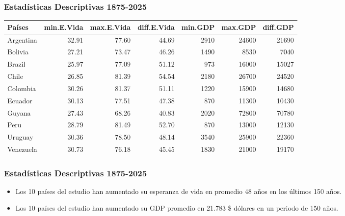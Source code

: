 \documentclass{beamer}
\begin{document}
\begin{frame}[fragile]
\frametitle{Estadísticas Descriptivas 1875-2025}
{\scriptsize
\begin{table}[ht]
\centering
\begin{tabular}{lrrrrrr}
  \hline
Países & min.E.Vida & max.E.Vida & diff.E.Vida & min.GDP & max.GDP & diff.GDP \\ 
  \hline
Argentina & 32.91 & 77.60 & 44.69 & 2910 & 24600 & 21690 \\ 
  Bolivia & 27.21 & 73.47 & 46.26 & 1490 & 8530 & 7040 \\ 
  Brazil & 25.97 & 77.09 & 51.12 & 973 & 16000 & 15027 \\ 
  Chile & 26.85 & 81.39 & 54.54 & 2180 & 26700 & 24520 \\ 
  Colombia & 30.26 & 81.37 & 51.11 & 1220 & 15900 & 14680 \\ 
  Ecuador & 30.13 & 77.51 & 47.38 & 870 & 11300 & 10430 \\ 
  Guyana & 27.43 & 68.26 & 40.83 & 2020 & 72800 & 70780 \\ 
  Peru & 28.79 & 81.49 & 52.70 & 870 & 13000 & 12130 \\ 
  Uruguay & 30.36 & 78.50 & 48.14 & 3540 & 25900 & 22360 \\ 
  Venezuela & 30.73 & 76.18 & 45.45 & 1830 & 21000 & 19170 \\ 
   \hline
\end{tabular}
\end{table}}
\end{frame}

\begin{frame}[fragile]
\frametitle{Estadísticas Descriptivas 1875-2025}
\begin{itemize}
\item<1> Los 10 países del estudio han aumentado su esperanza de vida en promedio 
48 años en los últimos 
150 años.
\item<2> Los 10 países del estudio han aumentado su GDP promedio en 
21.783 \$
dólares en un periodo de 150 años.
\end{itemize}
\end{frame}
\end{document}

